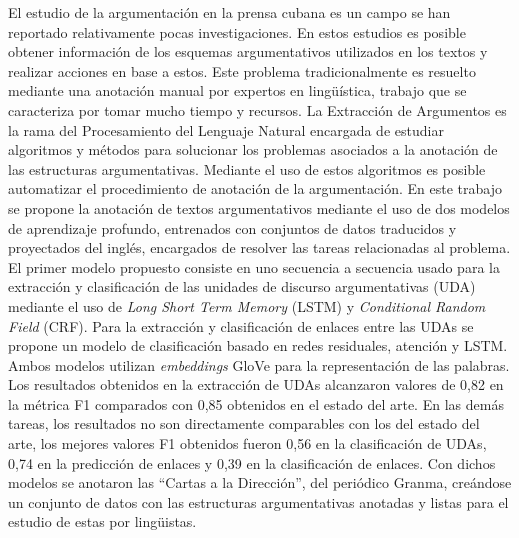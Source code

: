 \begin{resumen}



El estudio de la argumentación en la prensa cubana es un campo se han reportado
relativamente pocas investigaciones. En estos estudios es posible obtener 
información de los esquemas argumentativos utilizados en los textos y
realizar acciones en base a estos.
Este problema tradicionalmente es resuelto mediante 
una anotación manual por expertos en lingüística, trabajo que se 
caracteriza por tomar mucho tiempo y recursos. La Extracción
de Argumentos es la rama del Procesamiento del Lenguaje Natural
encargada de estudiar algoritmos y métodos para solucionar los problemas
asociados a la anotación de las estructuras argumentativas. Mediante el uso 
de estos algoritmos es posible automatizar el procedimiento de anotación
de la argumentación. 
En este trabajo se propone la anotación de textos argumentativos
mediante el uso de dos modelos de aprendizaje profundo, entrenados con 
conjuntos de datos traducidos y proyectados del inglés, encargados de resolver
las tareas relacionadas al problema. 
El primer modelo propuesto 
consiste en uno secuencia a secuencia usado para la extracción y clasificación
de las unidades de discurso argumentativas (UDA) mediante el uso de \emph{Long Short Term Memory} 
(LSTM) y \emph{Conditional Random Field} (CRF). Para la extracción y clasificación de 
enlaces entre las UDAs se propone un modelo de clasificación basado en redes residuales,
atención y LSTM. Ambos modelos utilizan \emph{embeddings} GloVe para la representación 
de las palabras. Los resultados obtenidos en la extracción de UDAs alcanzaron valores de
0,82 en la métrica F1 comparados con 0,85 obtenidos en el estado del arte. 
En las demás tareas, los resultados no son directamente comparables con los del estado del arte, 
los mejores valores F1 obtenidos fueron 0,56 en la clasificación de UDAs, 0,74 en la predicción
de enlaces y 0,39 en la clasificación de enlaces.
Con dichos modelos se anotaron las ``Cartas a la Dirección'', del 
periódico Granma, creándose un conjunto de datos con las estructuras argumentativas anotadas
y listas para el estudio de estas por lingüistas.


\end{resumen}
